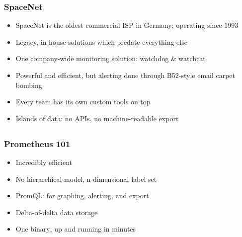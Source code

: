 \documentclass[t]{beamer}
\begin{document}
\begin{frame}
	\frametitle{SpaceNet}
	\begin{itemize}
		\item SpaceNet is the oldest commercial ISP in Germany; operating since 1993
		\item Legacy, in-house solutions which predate everything else
		\item One company-wide monitoring solution: watchdog \& watchcat
		\item Powerful and efficient, but alerting done through B52-style email carpet bombing
		\item Every team has its own custom tools on top
		\item Islands of data: no APIs, no machine-readable export
	\end{itemize}
\end{frame}

\subsection{}




\begin{frame}
	\frametitle{Prometheus 101}
	\begin{itemize}
		\item Incredibly efficient
		\item No hierarchical model, n-dimensional label set
		\item PromQL: for graphing, alerting, and export
		\item Delta-of-delta data storage
		\item One binary; up and running in minutes
	\end{itemize}
\end{frame}
\end{document}
